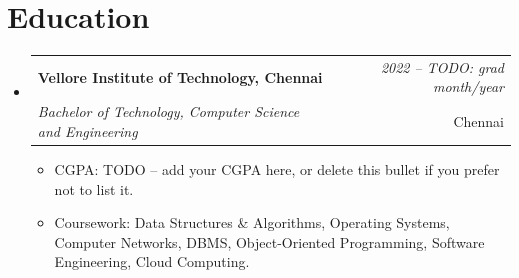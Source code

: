 \documentclass[a4paper,11pt]{article}
\makeatletter
\newcommand{\resumeSubheading}[4]{
\vspace{0.5mm}\item
    \begin{tabular*}{0.98\textwidth}[t]{l@{\extracolsep{\fill}}r}
        \textbf{#1} & \textit{\footnotesize{#4}} \\
        \textit{\footnotesize{#3}} &  \footnotesize{#2}\\
    \end{tabular*}
    \vspace{-2.4mm}
}
\newcommand{\resumeSubHeadingListStart}{\begin{itemize}[leftmargin=*,labelsep=0mm,label={}]}
\newcommand{\resumeItemListStart}{\begin{justify}\begin{itemize}[label=$\bullet$, leftmargin=3.4ex, rightmargin=1ex, noitemsep, labelsep=1.4mm, itemsep=0.35mm, topsep=0.6mm]\small}
\newcommand{\resumeSubHeadingListEnd}{\end{itemize}\vspace{2mm}}
\newcommand{\resumeItemListEnd}{\end{itemize}\end{justify}\vspace{-2mm}}
\makeatother
\begin{document}
\section{\textbf{Education}}
  \resumeSubHeadingListStart
    \resumeSubheading
      {Vellore Institute of Technology, Chennai}{Chennai}
      {Bachelor of Technology, Computer Science and Engineering}{2022 -- TODO: grad month/year}
      \vspace{-1.0mm}
      \resumeItemListStart
        \item {CGPA: TODO -- add your CGPA here, or delete this bullet if you prefer not to list it.}
        \item {Coursework: Data Structures \& Algorithms, Operating Systems, Computer Networks, DBMS, Object-Oriented Programming, Software Engineering, Cloud Computing.}
      \resumeItemListEnd
  \resumeSubHeadingListEnd
\vspace{-6mm}
\end{document}
